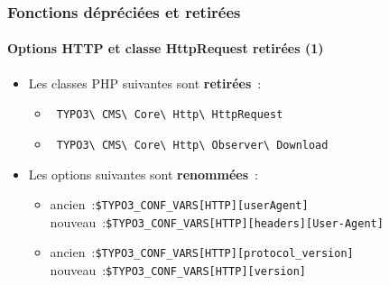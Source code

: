 \begin{frame}[fragile]
	\frametitle{Fonctions dépréciées et retirées}
	\framesubtitle{Options HTTP et classe HttpRequest retirées (1)}

	\begin{itemize}

		\item Les classes PHP suivantes sont \textbf{retirées}~:

			\begin{itemize}
				\item \small\texttt{
					TYPO3\textbackslash
					CMS\textbackslash
					Core\textbackslash
					Http\textbackslash
					HttpRequest}\normalsize
				\item \small\texttt{
					TYPO3\textbackslash
					CMS\textbackslash
					Core\textbackslash
					Http\textbackslash
					Observer\textbackslash
					Download}\normalsize
			\end{itemize}

		\item Les options suivantes sont \textbf{renommées}~:

			\begin{itemize}

				\item
					\small
						ancien~:\tabto{1.2cm}\texttt{\$TYPO3\_CONF\_VARS[HTTP][userAgent]}\newline
						nouveau~:\tabto{1.2cm}\texttt{\$TYPO3\_CONF\_VARS[HTTP][headers][User-Agent]}

				\item
					\small
						ancien~:\tabto{1.2cm}\texttt{\$TYPO3\_CONF\_VARS[HTTP][protocol\_version]}\newline
						nouveau~:\tabto{1.2cm}\texttt{\$TYPO3\_CONF\_VARS[HTTP][version]}

			\end{itemize}

	\end{itemize}

\end{frame}


